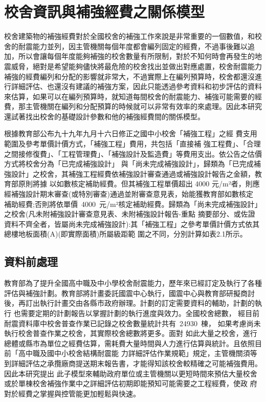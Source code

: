 \renewcommand\thetable{\arabic{chapter}-\arabic{table}}
\chapter{校舍資訊與補強經費之關係模型}

校舍建築物的補強經費對於全國校舍的補強工作來說是非常重要的一個數值，和校舍的耐震能力並列，因主管機關每個年度都會編列固定的經費，不過事後難以追加，所以會讓每個年度能夠補強的校舍數量有所限制，對於不知何時會再發生的地震威脅，絕對是希望能夠儘快將最危險的校舍找出並做出對應處置，校舍耐震能力補強的經費編列和分配的影響就非常大，不過實際上在編列預算時，校舍都還沒進行詳細評估、也還沒有建議的補強方案，因此只能透過參考資料和初步評估的資料來估算，如果可以在編列預算時，就知道每間校舍的耐震能力、補強可能需要的經費，那主管機關在編列和分配預算的時候就可以非常有效率的來處理。因此本研究還試著找出校舍的基礎設計參數和他的補強經費間的關係模型。

根據教育部公布九十九年九月十六日修正之國中小校舍「補強工程」之經 費支用範圍及參考單價計價方式，「補強工程」費用，共包括「直接補 強工程費」、「合理之間接修復費」、「工程管理費」、「補強設計及監造費」等費用支出。依公告之估價方式將校舍分為「已完成補強設計」 與「尚未完成補強設計」，歸類為「已完成補強設計」之校舍，其補強工程經費依補強設計審查通過或補強設計報告之金額，教育部原則將據 以如數核定補助經費。但其補強工程單價超出 4000 元/m²者，則應經補強設計期末審查(或特別審查)通過並附審查意見表，始能獲教育部如數核定 補助經費;否則將依單價~4000~元/m²核定補助經費。歸類為「尚未完成補強設計」之校舍(凡未附補強設計審查意見表、未附補強設計報告-重點 摘要部分、或佐證資料不齊全者，皆屬尚未完成補強設計):其「補強工程」之參考單價計價方式依其總樓地板面積(A)(即實際面積)所屬級距範 圍之不同，分別計算如表2.1所示。

\section{資料前處理}

教育部為了提升全國高中職及中小學校舍耐震能力，歷年來已經訂定及執行了各種評估與補強計劃。教育部將計畫委託國震中心執行，國震中心與教育部研擬商討後，再訂出執行計畫交由各縣市政府辦理。計劃的訂定需要資料的輔助，計劃的執行 也需要定期的計劃報告以掌握計劃的執行進度與效力。全國校舍總數， 經目前耐震資料庫中校舍普查作業已記錄之校舍數量統計共有~24930~棟， 如果考慮尚未執行校舍普查作業之校舍，其實際校舍總數將更多。面對 如此大量之校舍，進行總體或縣市為單位之經費估算，需耗費大量時間與人力進行估算與統計。且依照目前「高中職及國中小校舍結構耐震能 力詳細評估作業規範」規定，主管機關須等到詳細評估之承攬廠商提送期末報告書，才能得知該校舍較精確之可能補強費用。因此本研究提出 此子模型來輔助政府單位或主管機關以更短時間來預估大量校舍或於單棟校舍補強作業中之詳細評估初期即能預知可能需要之工程經費，使政 府對於經費之掌握與控管能更加輕鬆與快速。

